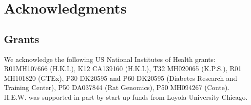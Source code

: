 \documentclass[10pt]{article}
\begin{document}
%
%
%
%
%
%
%
%

\section*{Acknowledgments}

\subsection*{Grants}\label{grants}

We acknowledge the following US National Institutes of Health grants:
R01MH107666 (H.K.I.), K12 CA139160 (H.K.I.), T32 MH020065 (K.P.S.), R01 MH101820 (GTEx), 
P30 DK20595 and P60 DK20595 (Diabetes Research and
Training Center), P50 DA037844 (Rat Genomics), P50 MH094267 (Conte). H.E.W. was
supported in part by start-up funds from Loyola University Chicago.
\end{document}
